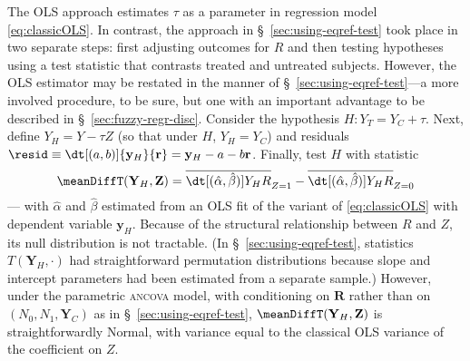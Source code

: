 The OLS approach estimates $\tau$ as a parameter in regression model
\eqref{eq:classicOLS}. In contrast, the approach in
\S~\ref{sec:using-eqref-test} took place in two separate steps:
first adjusting outcomes for $R$ and then testing hypotheses using a test
statistic that contrasts treated and untreated subjects.
However, the OLS estimator may be restated in the manner of
\S~\ref{sec:using-eqref-test}---a more involved procedure, to be sure,
but one with an important advantage to be described in \S~\ref{sec:fuzzy-regr-disc}.
Consider the hypothesis $H: Y_{T} = Y_{C} + \tau$.
Next, define ${{Y}_H} = {Y} - \tau {Z}$ (so that under $H$, $Y_H=Y_C$)
and residuals $\resid\equiv\dt[(a, b)]{\mathbf{y}_{H}}{ \mathbf{r}} = {\mathbf{y}_H} - a -
b\mathbf{r}$.
Finally, test $H$ with statistic
\begin{equation} \label{eq:MeanDiffTestStat}
\meanDiffT(\mathbf{Y}_H , \mathbf{Z}) =
\overline{\dt[(\hat{\alpha},\hat{\beta})]{{{Y}_H}}{ {R}}}_{Z=1} -
\overline{\dt[(\hat{\alpha},\hat{\beta})]{{{Y}_H}}{ {R}}}_{Z=0}
\end{equation}
--- with $\hat{\alpha}$ and $\hat{\beta}$ estimated from an OLS fit of the variant of \eqref{eq:classicOLS}
with dependent variable $\mathbf{y}_{H}$.
Because of the structural relationship
between $R$ and $Z$, its null distribution
is not tractable. (In \S~\ref{sec:using-eqref-test}, statistics
$T(\mathbf{Y}_{H}, \cdot)$ had straightforward permutation distributions
because slope and intercept parameters had been estimated
from a separate sample.) However, under the parametric \textsc{ancova} model, with
conditioning on $\mathbf{R}$ rather than on $(N_{0}, N_{1},
\mathbf{Y}_{C})$ as in \S~\ref{sec:using-eqref-test},
$\meanDiffT(\mathbf{Y}_H , \mathbf{Z})$ is straightforwardly Normal, with
variance equal to the classical OLS variance of the coefficient on
$Z$.


